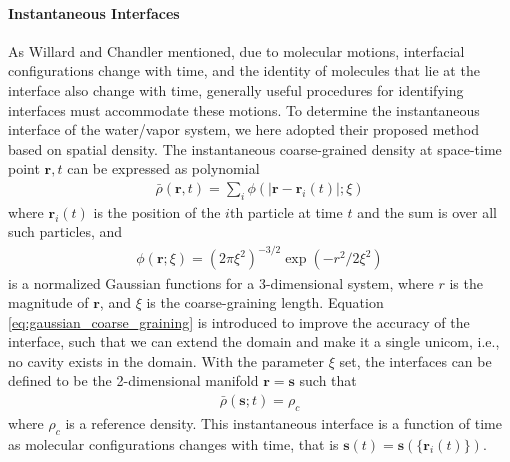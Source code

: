 \FloatBarrier
\paragraph{Instantaneous Interfaces}
As Willard and Chandler mentioned, due to molecular motions, interfacial configurations
change with time, and the identity of molecules that lie at the interface also change with time, generally useful procedures for
identifying interfaces must accommodate these motions. \cite{Willard2010} 
To determine the instantaneous interface of the water/vapor system, we here adopted their proposed method based on spatial density.
The instantaneous coarse-grained density at space-time point $\mathbf{r},t$ can be expressed as polynomial
\begin{eqnarray}
\bar{\rho}(\mathbf{r}, t)=\sum_{i} \phi(|\mathbf{r}-\mathbf{r}_{i}(t)|; \xi) 
\end{eqnarray}
where ${\mathbf{r}}_i(t)$ is the position of the $i$th particle at time $t$ and the sum is over all such particles, and 
\begin{eqnarray}
\phi(\mathbf{r};\xi)=(2 \pi \xi^{2})^{-3/ 2} \exp (-r^{2} / 2 \xi^{2}) 
\label{eq:gaussian_coarse_graining}
\end{eqnarray} 
is a normalized Gaussian functions for a 3-dimensional system, where $r$ is the magnitude of ${\mathbf r}$, and $\xi$ is the coarse-graining length.
Equation \ref{eq:gaussian_coarse_graining} is introduced to improve the accuracy of the interface, such that we can extend the domain and make it a single unicom,
i.e., no cavity exists in the domain.
With the parameter $\xi$ set, the interfaces can be defined to be the 2-dimensional manifold ${\mathbf r} = {\mathbf s}$ such that
\begin{eqnarray}
\bar\rho(\mathbf{s};t)= \rho_c 
\label{eq:rho_c}
\end{eqnarray} 
where $\rho_c$ is a reference density. This instantaneous interface is a function of time as molecular configurations changes with time, that is 
${\mathbf s}(t) = {\mathbf s}(\{{\mathbf r}_i(t)\})$. 

